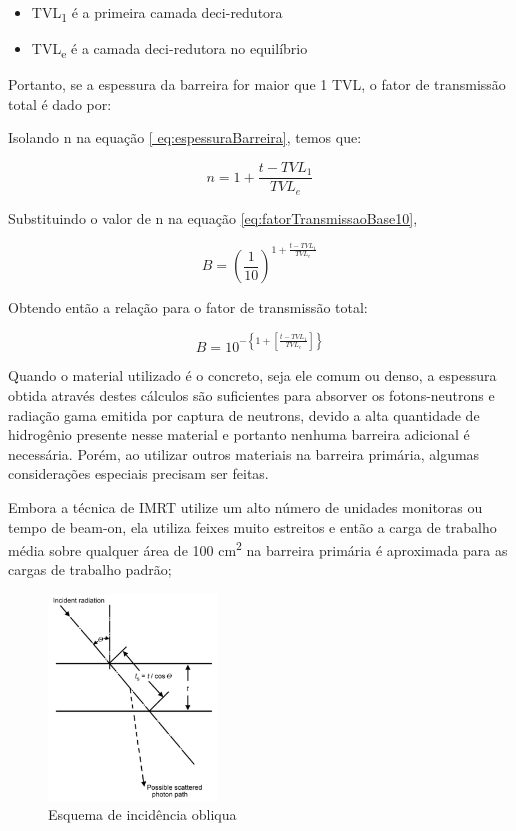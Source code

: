 \documentclass[11pt,a4paper]{article}
\begin{document}
            \begin{itemize}
                \item TVL\textsubscript{1} é a primeira camada deci-redutora
                \item TVL\textsubscript{e} é a camada deci-redutora no equilíbrio
            \end{itemize}

            Portanto, se a espessura da barreira for maior que 1 TVL, o fator de transmissão total é dado por:

            Isolando n na equação \ref{ eq:espessuraBarreira}, temos que:

            $$n = 1 + \frac{t - TVL_1}{TVL_e}$$

            Substituindo o valor de n na equação \ref{eq:fatorTransmissaoBase10},

            $$B = \left(\frac{1}{10}\right)^{1 + \frac{t - TVL_1}{TVL_e}}$$

            Obtendo então a relação para o fator de transmissão total:

            \begin{equation}
                B = 10^{-\left\{1 + \left[\frac{t - TVL_1}{TVL_e}\right]\right\}}
            \end{equation}

            
            Quando o material utilizado é o concreto, seja ele comum ou denso, a espessura obtida através destes cálculos são suficientes para absorver os fotons-neutrons e radiação gama emitida por captura de neutrons, devido a alta quantidade de hidrogênio presente nesse material e portanto nenhuma barreira adicional é necessária. Porém, ao utilizar outros materiais na barreira primária, algumas considerações especiais precisam ser feitas.

            Embora a técnica de IMRT utilize um alto número de unidades monitoras ou tempo de beam-on, ela utiliza feixes muito estreitos e então a carga de trabalho média sobre qualquer área de 100 cm\textsuperscript{2} na barreira primária é aproximada para as cargas de trabalho padrão;

            \begin{figure}
                \centering
                \includegraphics[width=0.4\textwidth]{Imagens/esquemaIncidenciaObliqua.JPG}
                \caption{Esquema de incidência obliqua}
                \label{fig:esquemaIncidenciaObliqua}
            \end{figure}
\end{document}
